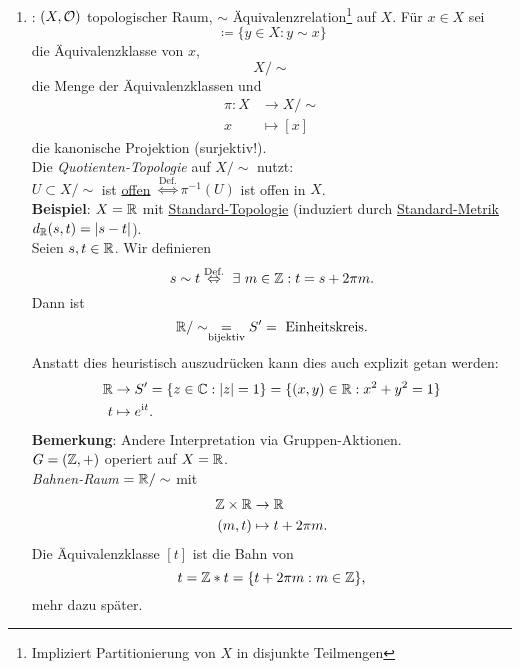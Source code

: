 \begin{remark}
\begin{enumerate}
    \item {}: $ (X, \mathcal{O}) $ topologischer Raum, $ \sim $ Äquivalenzrelation\footnote{Impliziert Partitionierung von $ X $ in disjunkte Teilmengen} auf $ X $. Für $ x \in X $ sei
    \begin{equation*}
      [x] \coloneqq  \{ y \in X : y \sim x \}
    \end{equation*}
    die Äquivalenzklasse von $ x $,
    \begin{equation*}
      X/\sim
    \end{equation*}
    die Menge der Äquivalenzklassen und
    \begin{align*}
      \pi : X &\to X/\sim \\
      x &\mapsto [x]
    \end{align*}
    die kanonische Projektion (surjektiv!). \\
    Die \emph{Quotienten-Topologie} auf $ X/\sim $ nutzt: \\
    $ U \subset X/\sim $ ist \underline{offen} $ \overset{\text{Def.}}{\Leftrightarrow} \pi^{-1}(U) $ ist offen in $ X $. \\
    \textbf{Beispiel}: $ X = \mathbb{R} $ mit \hyperref[bsp:standardtopologie]{Standard-Topologie} (induziert durch \hyperref[bsp:standardmetrik]{Standard-Metrik} $ d_{\mathbb{R}}(s,t) = \vert s-t \vert $). \\
    Seien $ s, t \in \mathbb{R} $. Wir definieren
    \begin{equation*}
      s \sim t \overset{\text{Def.}}{\Leftrightarrow} \ \exists \ m \in \mathbb{Z} : t = s + 2\pi m\text{.}
    \end{equation*}
    Dann ist
    \begin{equation*}
      \mathbb{R}/\sim \underset{\text{bijektiv}}{=} S' = \text{ Einheitskreis}\text{.}
    \end{equation*}
    Anstatt dies heuristisch auszudrücken kann dies auch explizit getan werden:
    \begin{align*}
      \mathbb{R} &\to S' = \{ z \in \mathbb{C} : \vert z \vert = 1 \} = \{ (x, y) \in \mathbb{R} : x^2+y^2 = 1 \} \\
      t &\mapsto e^{\text{\rmfamily i} t}\text{.}
    \end{align*}
    \textbf{Bemerkung}: Andere Interpretation via Gruppen-Aktionen. \\
    $ G = (\mathbb{Z}, +) $ operiert auf $ X = \mathbb{R} $. \\
    \emph{Bahnen-Raum} $ = \mathbb{R}/\sim $ mit
    \begin{align*}
      \mathbb{Z} \times \mathbb{R} &\to \mathbb{R} \\
      (m, t) &\mapsto t + 2\pi m\text{.}
    \end{align*}
    Die Äquivalenzklasse $ [t] $ ist die Bahn von
    \begin{equation*}
      t = \mathbb{Z}*t = \{ t+2\pi m : m \in \mathbb{Z} \}\text{,}
    \end{equation*}
    mehr dazu später.
  \end{enumerate}
\end{remark}

